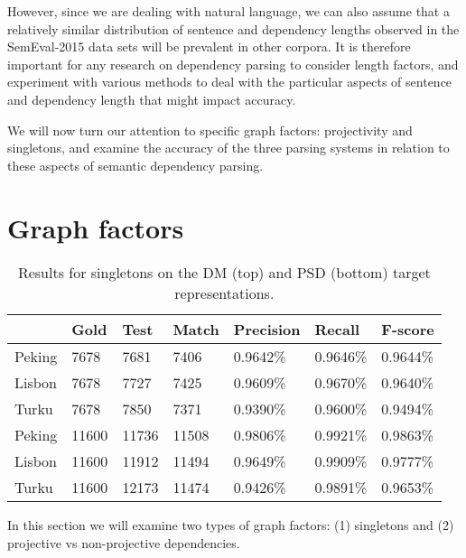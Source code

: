 However, since we are dealing with natural language, we can also assume that a relatively similar distribution of sentence and dependency lengths observed in the SemEval-2015 data sets will be prevalent in other corpora. It is therefore important for any research on dependency parsing to consider length factors, and experiment with various methods to deal with the particular aspects of sentence and dependency length that might impact accuracy. 

We will now turn our attention to specific graph factors: projectivity and singletons, and examine the accuracy of the three parsing systems in relation to these aspects of semantic dependency parsing.

\section{Graph factors}

\begin{table}
    \centering
    \smaller[0.5]
    \begin{tabular}{@{}lllllll@{}}
        \toprule
        \textbf{ } & \textbf{Gold} & \textbf{Test} & \textbf{Match} & \textbf{Precision} & \textbf{Recall} & \textbf{F-score} \\
        \midrule
        Peking &7678       &7681       &7406       &0.9642\%     &0.9646\%     &0.9644\%    \\
        Lisbon &7678       &7727       &7425       &0.9609\%     &0.9670\%     &0.9640\%    \\
        Turku &7678       &7850       &7371       &0.9390\%    &0.9600\%     &0.9494\%    \\
        \midrule
        Peking &11600      &11736      &11508      &0.9806\%     &0.9921\%     &0.9863\%    \\
        Lisbon &11600      &11912      &11494      &0.9649\%     &0.9909\%     &0.9777\%    \\
        Turku &11600      &12173      &11474      &0.9426\%     &0.9891\%     &0.9653\%    \\
        \bottomrule
    \end{tabular}
    \caption{Results for singletons on the DM (top) and PSD (bottom) target representations.}
    \label{fig:singletons}
\end{table}

In this section we will examine two types of graph factors: (1) singletons and (2) projective vs non-projective dependencies.

